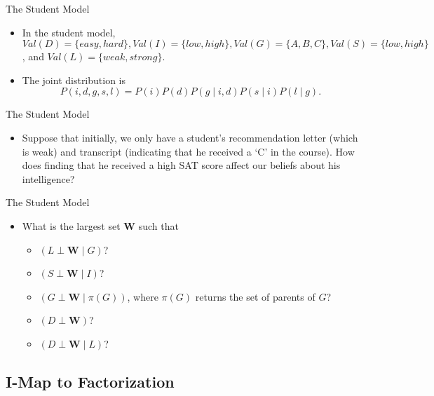 \documentclass[11pt]{beamer}
\begin{document}
\begin{frame}{The Student Model}
\vspace{0pt}
\centering
\resizebox{0.8\textwidth}{!}{\studentmodel}
\begin{itemize}
	\item In the student model, $Val(D) = \{easy,hard\}, Val(I) =
	\{low,high\}, Val(G) = \{A,B,C\}, Val(S) = \{low,high\}$, and $Val(L) =
	\{weak,strong\}$.
	\item The joint distribution is
	\[
		P(i,d,g,s,l) = P(i)P(d)P(g\;|\;i,d)P(s\;|\;i)P(l\;|\;g).
	\]
\end{itemize}
\end{frame}

\begin{frame}{The Student Model}
\vspace{0pt}
\centering
\resizebox{0.8\textwidth}{!}{\studentmodel}
\begin{itemize}
	\item Suppose that initially, we only have a student's recommendation
	letter (which is weak) and transcript (indicating that he received a `C'
	in the course). How does finding that he received a high SAT score
	affect our beliefs about his intelligence?
\end{itemize}
\end{frame}

\begin{frame}{The Student Model}
\vspace{0pt}
\centering
\resizebox{0.8\textwidth}{!}{\studentmodel}
\begin{itemize}
	\item What is the largest set $\boldsymbol{W}$ such that
	\begin{itemize}
		\item $(L \perp	\boldsymbol{W} \;|\; G)$?
		\item $(S \perp \boldsymbol{W} \;|\; I)$?
		\item $(G \perp \boldsymbol{W} \;|\; \pi(G))$, where $\pi(G)$
		returns the set of parents of $G$?
		\item $(D \perp \boldsymbol{W})$?
		\item $(D \perp \boldsymbol{W} \;|\; L)$?
	\end{itemize}
\end{itemize}
\end{frame}

\subsection{I-Map to Factorization}
\end{document}
